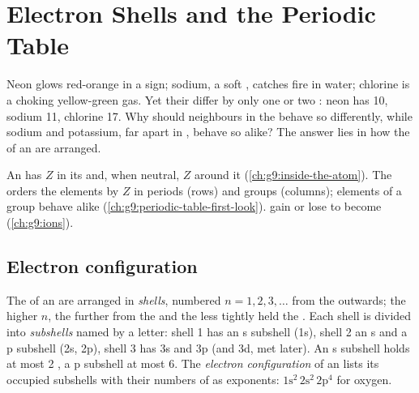 \chapter{Electron Shells and the Periodic Table}\label{ch:g10:electron-shells}

Neon glows red-orange in a sign; sodium, a soft , catches fire in
water; chlorine is a choking yellow-green gas. Yet their  differ by
only one or two : neon has 10, sodium 11, chlorine 17. Why should
neighbours in the  behave so differently, while sodium and
potassium, far apart in , behave so alike? The answer lies
in how the  of an  are arranged.

\begin{recall}
An  has $Z$  in its  and, when neutral, $Z$ 
around it (\cref{ch:g9:inside-the-atom}). The  orders the
elements by $Z$ in periods (rows) and groups (columns); elements of a
group behave alike (\cref{ch:g9:periodic-table-first-look}).  gain or
lose  to become  (\cref{ch:g9:ions}).
\end{recall}

\section{Electron configuration}

\begin{definition}\label{def:g10:electron-shells:configuration}
The  of an  are arranged in \emph{shells},
numbered $n = 1, 2, 3, \ldots$ from the  outwards; the higher
$n$, the further from the  and the less tightly held the
. Each shell is divided into \emph{subshells}
named by a letter: shell 1 has an s subshell (1s), shell 2 an s and a p
subshell (2s, 2p), shell 3 has 3s and 3p (and 3d, met later). An s
subshell holds at most 2 , a p subshell at most 6. The
\emph{electron configuration} of an 
lists its occupied subshells with their numbers of  as
exponents: $1\mathrm{s}^2\,2\mathrm{s}^2\,2\mathrm{p}^4$ for oxygen.
\end{definition}

